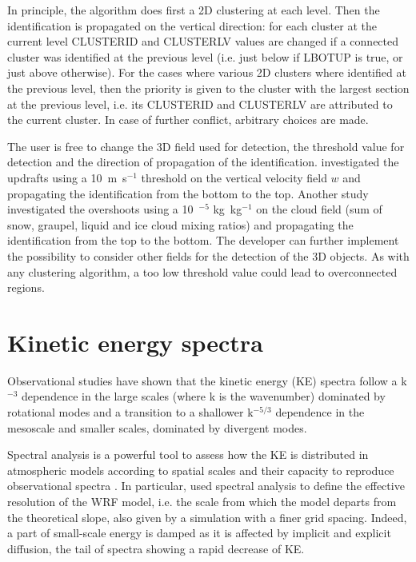 In principle, the algorithm does first a 2D clustering at each level. Then the identification is propagated on the vertical direction: for each cluster at the current level CLUSTERID and CLUSTERLV values are changed if a connected cluster was identified at the previous level (i.e. just below if LBOTUP is true, or just above otherwise). For the cases where various 2D clusters where identified at the previous level, then the priority is given to the cluster with the largest section at the previous level, i.e. its CLUSTERID and CLUSTERLV are attributed to the current cluster. In case of further conflict, arbitrary choices are made.

The user is free to change the 3D field used for detection, the threshold value for detection and the direction of propagation of the identification. \citet{Dauhut2016} investigated the updrafts using a 10~m~s$^{-1}$ threshold on the vertical velocity field $w$ and propagating the identification from the bottom to the top. Another study investigated the overshoots using a 10~$^{-5}$ kg~kg$^{-1}$ on the cloud field (sum of snow, graupel, liquid and ice cloud mixing ratios) and propagating the identification from the top to the bottom. The developer can further implement the possibility to consider other fields for the detection of the 3D objects. As with any clustering algorithm, a too low threshold value could lead to overconnected regions.
%
\section{Kinetic energy spectra}
%
Observational studies \citep{Nastrom1985,Lindborg1999} have shown that the kinetic energy (KE) spectra follow a k$^{-3}$ dependence in the large scales 
(where k is the wavenumber) dominated by rotational modes and a transition to a shallower k$^{-5/3}$ dependence in the mesoscale and smaller scales, dominated by divergent modes. 


Spectral analysis is a powerful tool to assess how the KE is distributed in atmospheric models according to spatial scales and their capacity to reproduce 
observational spectra \citep{Koshyk1999}. In particular, \citet{Skamarock2004} used spectral analysis to define the effective resolution of the WRF model, i.e. the scale from which the model departs from the theoretical slope, also given by a simulation with 
a finer grid spacing. Indeed, a part of small-scale energy is damped as it is affected by implicit and
explicit diffusion, the tail of spectra showing a rapid decrease of KE. 


